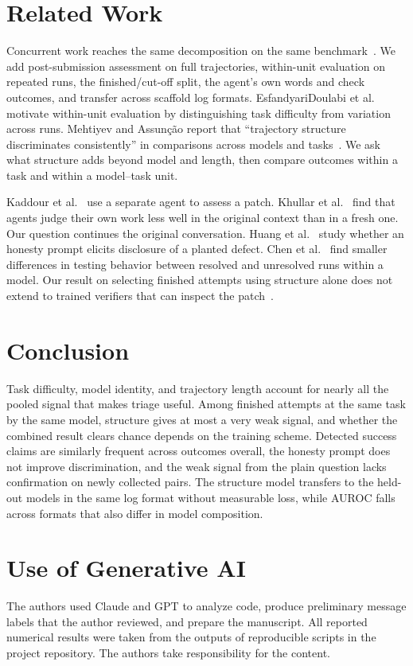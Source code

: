 \section{Related Work}
\label{sec:related}

Concurrent work reaches the same decomposition on the same benchmark~\cite{shi2026hardissue}. We add post-submission assessment on full trajectories, within-unit evaluation on repeated runs, the finished/cut-off split, the agent's own words and check outcomes, and transfer across scaffold log formats. EsfandyariDoulabi et al.~\cite{esfandyaridoulabi2026disentangling} motivate within-unit evaluation by distinguishing task difficulty from variation across runs. Mehtiyev and Assun\c{c}\~ao report that ``trajectory structure discriminates consistently'' in comparisons across models and tasks~\cite{mehtiyev2026beyond}. We ask what structure adds beyond model and length, then compare outcomes within a task and within a model--task unit.

Kaddour et al.~\cite{kaddour2026agentic} use a separate agent to assess a patch. Khullar et al.~\cite{khullar2026selfattribution} find that agents judge their own work less well in the original context than in a fresh one. Our question continues the original conversation. Huang et al.~\cite{huang2026insecure} study whether an honesty prompt elicits disclosure of a planted defect. Chen et al.~\cite{chen2026agenttests} find smaller differences in testing behavior between resolved and unresolved runs within a model. Our result on selecting finished attempts using structure alone does not extend to trained verifiers that can inspect the patch~\cite{jain2025r2egym}.

\section{Conclusion}
\label{sec:conclusion}

Task difficulty, model identity, and trajectory length account for nearly all the pooled signal that makes triage useful. Among finished attempts at the same task by the same model, structure gives at most a very weak signal, and whether the combined result clears chance depends on the training scheme. Detected success claims are similarly frequent across outcomes overall, the honesty prompt does not improve discrimination, and the weak signal from the plain question lacks confirmation on newly collected pairs. The structure model transfers to the held-out models in the same log format without measurable loss, while AUROC falls across formats that also differ in model composition.

\section*{Use of Generative AI}

The authors used Claude and GPT to analyze code, produce preliminary message labels that the author reviewed, and prepare the manuscript. All reported numerical results were taken from the outputs of reproducible scripts in the project repository. The authors take responsibility for the content. 
